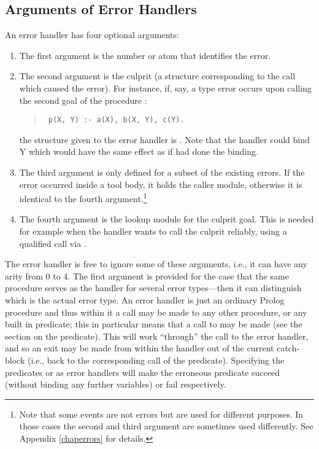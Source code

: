 \subsection{Arguments of Error Handlers}
An error handler has four optional arguments:
\begin{enumerate}
\item The first argument is the number or atom that identifies the error.
\item The second argument is
the culprit (a structure corresponding to the call which caused the
error).
For instance, if,
say, a type error occurs upon calling the second goal of the procedure
:
\begin{quote}
\begin{verbatim}
 p(X, Y) :- a(X), b(X, Y), c(Y).
\end{verbatim}
\end{quote}
the structure given to the error handler is .
Note that the handler could bind Y which would have the same effect
as if  had done the binding.

\item The third argument is only defined for a subset of the existing errors.
If the error occurred inside a tool body, it holds the caller module,
otherwise it is identical to the fourth argument.\footnote{%
  Note that some events are not errors but are used for different purposes.
  In those cases the second and third argument are sometimes used
  differently. See Appendix \ref{chaperrors} for details.}

\item The fourth argument is the lookup module for the culprit goal.  This
is needed for example when the handler wants to call the culprit reliably,
using a qualified call via .
\end{enumerate}

The error handler is free to ignore some of these arguments,
i.e., it can have any arity from 0 to 4.
The first argument is provided for the case that the same procedure serves
as the handler for several error types---then it can distinguish
which is the actual error type.
An error handler is just an ordinary Prolog procedure and thus within
it a call may be made to any other procedure, or any built in predicate;
this in particular means that a call to
 may be
made (see the section on the
predicate). This will work
``through'' the call to the error handler, and so an exit may be made from
within the handler out of the current catch-block (i.e., back to the corresponding
call of the  predicate).
Specifying the predicates  or
 as error handlers
will make the erroneous predicate succeed (without binding
any further variables) or fail respectively.

